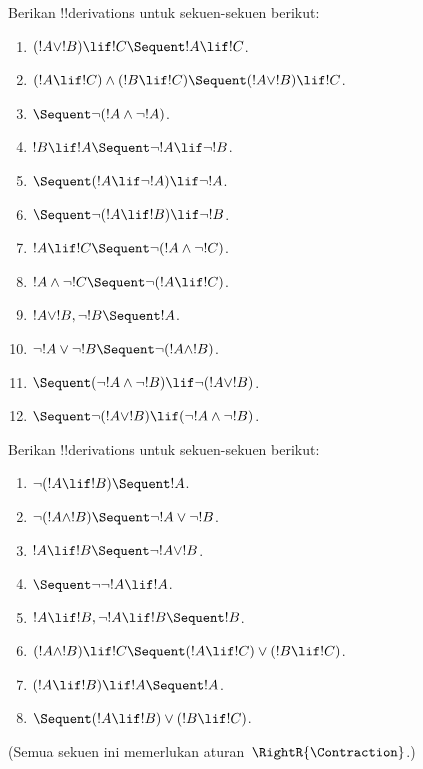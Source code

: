 \documentclass[../../../include/open-logic-section]{subfiles}
\begin{document}
\begin{prob}
Berikan !!{derivation}s untuk sekuen-sekuen berikut:
\begin{enumerate}
\item $(!A \lor !B) \lif !C \Sequent !A \lif !C$.
\item $(!A \lif !C) \land (!B \lif !C) \Sequent (!A \lor !B) \lif !C$.
\item $\Sequent \lnot(!A \land \lnot !A)$.
\item $!B \lif !A \Sequent \lnot !A \lif \lnot !B$.
\item $\Sequent (!A \lif \lnot !A) \lif \lnot !A$.
\item $\Sequent \lnot(!A \lif !B) \lif \lnot !B$.
\item $!A \lif !C \Sequent \lnot (!A \land \lnot !C)$.
\item $!A \land \lnot !C \Sequent \lnot (!A \lif !C)$.
\item $!A \lor !B, \lnot !B \Sequent !A$.
\item $\lnot !A \lor \lnot !B \Sequent \lnot(!A \land !B)$.
\item $\Sequent (\lnot !A \land \lnot !B) \lif\lnot(!A \lor !B)$.
\item $\Sequent \lnot(!A \lor !B) \lif (\lnot !A \land \lnot !B)$.
\end{enumerate}
\end{prob}

\begin{prob}
Berikan !!{derivation}s untuk sekuen-sekuen berikut:
\begin{enumerate}
\item $\lnot(!A \lif !B) \Sequent !A$.
\item $\lnot(!A \land !B) \Sequent \lnot !A \lor \lnot !B$.
\item $!A \lif !B \Sequent \lnot !A \lor !B$.
\item $\Sequent \lnot \lnot !A \lif !A$.
\item $!A \lif !B, \lnot !A \lif !B \Sequent !B$.
\item $(!A \land !B) \lif !C \Sequent (!A \lif !C) \lor (!B \lif !C)$.
\item $(!A \lif !B) \lif !A \Sequent !A$.
\item $\Sequent (!A \lif !B) \lor (!B \lif !C)$.
\end{enumerate}
(Semua sekuen ini memerlukan aturan~$\RightR{\Contraction}$.)
\end{prob}
\end{document}
